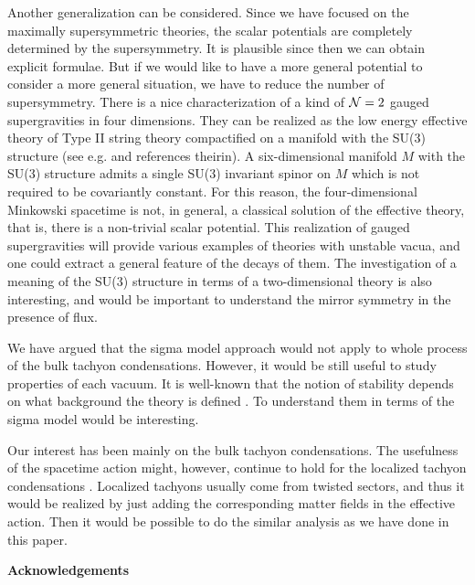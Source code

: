 \documentclass[a4paper,a4paper]{article}
\begin{document}
Another generalization can be considered. 
Since we have focused on the maximally supersymmetric theories, the scalar potentials are completely determined 
by the supersymmetry. 
It is plausible since then we can obtain explicit formulae. 
But if we would like to have a more general potential to consider a more general situation, we have to reduce 
the number of supersymmetry. 
There is a nice characterization of a kind of ${\cal N}=2$ gauged supergravities in four dimensions. 
They can be realized as the low energy effective theory of Type II string theory compactified on a manifold with 
the SU(3) structure (see e.g. \cite{SU(3)str} and references theirin). 
A six-dimensional manifold $M$ with the SU(3) structure admits a single SU(3) invariant spinor on $M$ which is 
not required to be covariantly constant. 
For this reason, the four-dimensional Minkowski spacetime 
is not, in general, a classical solution of the effective 
theory, that is, there is a non-trivial scalar potential. 
This realization of gauged supergravities will provide various examples of theories with unstable vacua, and 
one could extract a general feature of the decays of them. 
The investigation of a meaning of the SU(3) structure in terms of a two-dimensional theory is also interesting, 
and would be important to understand the mirror symmetry in the presence of flux. 

\vspace{3mm}

We have argued that the sigma model approach would not apply to whole process of the bulk tachyon condensations. 
However, it would be still useful to study properties of each vacuum. 
It is well-known that the notion of stability depends on what background the theory is defined \cite{BFbound}. 
To understand them in terms of the sigma model would be interesting. 

\vspace{3mm}

Our interest has been mainly on the bulk tachyon condensations. 
The usefulness of the spacetime action might, however, continue to hold for the localized tachyon condensations 
\cite{localized}. 
Localized tachyons usually come from twisted sectors, and thus it would be realized by just adding the 
corresponding matter fields in the effective action. 
Then it would be possible to do the similar analysis as we have done in this paper. 

\vspace{2cm}

{\bf {\Large Acknowledgements}}
\end{document}
